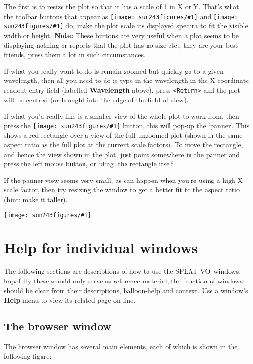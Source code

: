 \documentclass[twoside,11pt]{article}
\newcommand{\htmladdimg}[1]{}
\newcommand{\latexhtml}[2]{#1}
\newcommand{\xlabel}[1]{}
\renewcommand{\_}{\texttt{\symbol{95}}}
\newcommand{\SPLAT}{\textsf{SPLAT-VO}}
\newcommand{\mainfigure}[1]
{\begin{center}
 \latexhtml{\texttt{[image: sun243\_figures/\#1]}}{\htmladdimg{#1.gif}}
 \end{center}
}
\newcommand{\inline}[1]
        {\latexhtml{\texttt{[image: sun243\_figures/\#1]}}
        {\htmladdimg[align=center]{#1.gif}}}
\newcommand{\menuitem}[1]{\textbf{#1}}
\newcommand{\labelitem}[1]{\textbf{#1}}
\newcommand{\hitext}[1]{\texttt{#1}}
\begin{document}
The first is to resize the plot so that it has a scale of 1 in X or
Y. That's what the toolbar buttons that appear as
\inline{fitwidth} and \inline{fitheight} do, make the plot scale its
displayed spectra to fit the visible width or height.
\textbf{Note:} These buttons are very useful when a plot seems to be
displaying nothing or reports that the plot has no size etc., they are your
best friends, press them a lot in such circumstances.

If what you really want to do is remain zoomed but quickly go to a
given wavelength, then all you need to do is type in the wavelength in
the X-coordinate readout entry field (labelled \labelitem{Wavelength}
above), press \hitext{<Return>} and the plot will be centred (or
brought into the edge of the field of view).

If what you'd really like is a smaller view of the whole plot to work
from, then press the \inline{panner} button, this will pop-up the
`panner'. This shows a red rectangle over a view of the full unzoomed
plot (shown in the same aspect ratio as the full plot at the current
scale factors). To move the rectangle, and hence the view shown in the
plot, just point somewhere in the panner and press the left mouse
button, or `drag' the rectangle itself.

If the panner view seems very small, as can happen when you're using a
high X scale factor, then try resizing the window to get a better fit
to the aspect ratio (hint: make it taller).

\mainfigure{pannerwindow}

\section{Help for individual windows\xlabel{help_window_individual}}

The following sections are descriptions of how to use the
\SPLAT\ windows, hopefully these should only serve as reference
material, the function of windows should be clear from their
descriptions, balloon-help and context. Use a window's \menuitem{Help}
menu to view its related page on-line.

\newpage
\subsection{The browser window\xlabel{browser_window}}

The browser window has several main elements, each of which is shown
in the following figure:
\end{document}

